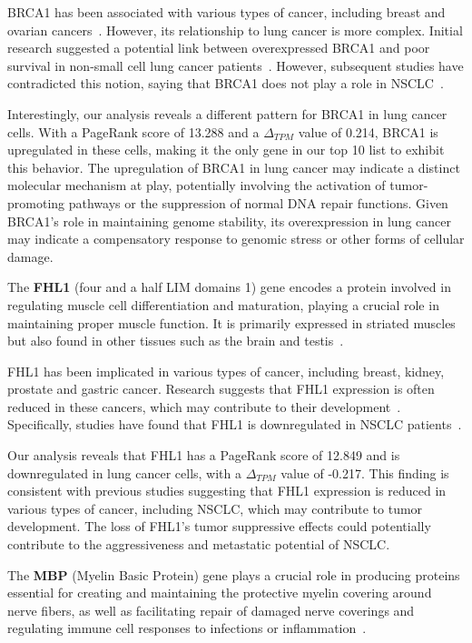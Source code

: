 BRCA1 has been associated with various types of cancer, including breast and ovarian cancers~\cite{Lee2020BRCA1}.
However, its relationship to lung cancer is more complex.
Initial research suggested a potential link between overexpressed BRCA1 and
poor survival in non-small cell lung cancer patients~\cite{Rosell2007BRCA1}.
However, subsequent studies have contradicted this notion,
saying that BRCA1 does not play a role in NSCLC~\cite{Gachechiladze2012BRCA1,Lee2020BRCA1}.

Interestingly, our analysis reveals a different pattern for BRCA1 in lung cancer cells.
With a PageRank score of 13.288 and a $\Delta_{TPM}$ value of 0.214,
BRCA1 is upregulated in these cells, making it the only gene in our top 10 list to exhibit this behavior.
The upregulation of BRCA1 in lung cancer may indicate a distinct molecular mechanism at play,
potentially involving the activation of tumor-promoting pathways or the suppression of normal DNA repair functions.
Given BRCA1's role in maintaining genome stability,
its overexpression in lung cancer may indicate a compensatory response to genomic stress or other forms of cellular damage.
\newline

The \textbf{FHL1} (four and a half LIM domains 1) gene encodes a protein
involved in regulating muscle cell differentiation and maturation,
playing a crucial role in maintaining proper muscle function.
It is primarily expressed in striated muscles but also found in other tissues such as the brain and testis~\cite{Storey2020FHL1}.

FHL1 has been implicated in various types of cancer, including breast, kidney, prostate and gastric cancer.
Research suggests that FHL1 expression is often reduced in these cancers,
which may contribute to their development~\cite{Li2008FHL1, Sakashita2008FHL1}.
Specifically, studies have found that FHL1 is downregulated in NSCLC patients~\cite{Niu2012FHL1}.

Our analysis reveals that FHL1 has a PageRank score of 12.849 and is downregulated in lung cancer cells,
with a $\Delta_{TPM}$ value of -0.217.
This finding is consistent with previous studies suggesting that FHL1 expression is reduced in various types of cancer,
including NSCLC, which may contribute to tumor development.
The loss of FHL1's tumor suppressive effects could potentially contribute to the aggressiveness and metastatic potential of NSCLC.
\newline

The \textbf{MBP} (Myelin Basic Protein) gene plays a crucial role in producing proteins essential for creating and
maintaining the protective myelin covering around nerve fibers, as well as
facilitating repair of damaged nerve coverings and regulating immune cell responses to infections or inflammation~\cite{Nye1995MBP}.


